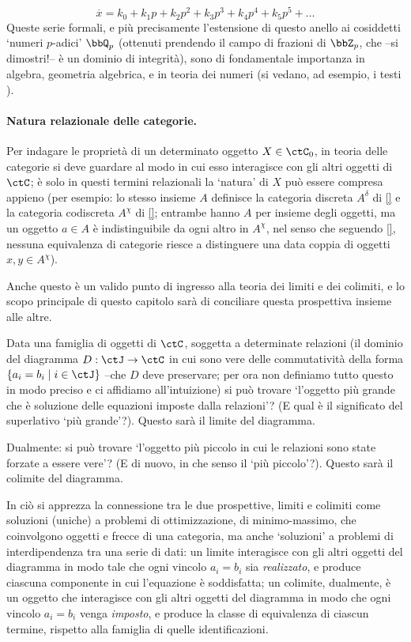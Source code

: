 \[\overline x = k_0 + k_1p + k_2p^2 + k_3p^3 + k_4p^4 + k_5p^5 + \dots \]
Queste serie formali, e più precisamente l'estensione di questo anello ai cosiddetti `numeri \(p\)-adici' \(\bbQ_p\) (ottenuti prendendo il campo di frazioni di \(\bbZ_p\), che --si dimostri!-- è un dominio di integrità), sono di fondamentale importanza in algebra, geometria algebrica, e in teoria dei numeri (si vedano, ad esempio, i testi \cite{a,b,c}).
\paragraph*{Natura relazionale delle categorie.}
Per indagare le proprietà di un determinato oggetto \(X\in\ctC_0\), in teoria delle categorie si deve guardare al modo in cui esso interagisce con gli altri oggetti di \(\ctC\); è solo in questi termini relazionali la `natura' di $X$ può essere compresa appieno (per esempio: lo stesso insieme $A$ definisce la categoria discreta $A^\delta$ di \ref{} e la categoria codiscreta $A^\chi$ di \ref{}; entrambe hanno $A$ per insieme degli oggetti, ma un oggetto $a\in A$ è indistinguibile da ogni altro in $A^\chi$, nel senso che seguendo \ref{}, nessuna equivalenza di categorie riesce a distinguere una data coppia di oggetti $x,y\in A^\chi$).

Anche questo è un valido punto di ingresso alla teoria dei limiti e dei colimiti, e lo scopo principale di questo capitolo sarà di conciliare questa prospettiva insieme alle altre.

Data una famiglia di oggetti di \(\ctC\), soggetta a determinate relazioni (il dominio del diagramma $D : \ctJ \to \ctC$ in cui sono vere delle commutatività della forma \(\{a_i=b_i\mid i\in \ctJ\}\) --che $D$ deve preservare; per ora non definiamo tutto questo in modo preciso e ci affidiamo all'intuizione) si può trovare `l'oggetto più grande che è soluzione delle equazioni imposte dalla relazioni'? (E qual è il significato del superlativo `più grande'?). Questo sarà il limite del diagramma. 

Dualmente: si può trovare `l'oggetto più piccolo in cui le relazioni sono state forzate a essere vere'? (E di nuovo, in che senso il `più piccolo'?). Questo sarà il colimite del diagramma.

In ciò si apprezza la connessione tra le due prospettive, limiti e colimiti come soluzioni (uniche) a problemi di ottimizzazione, di minimo-massimo, che coinvolgono oggetti e frecce di una categoria, ma anche `soluzioni' a problemi di interdipendenza tra una serie di dati: un limite interagisce con gli altri oggetti del diagramma in modo tale che ogni vincolo \(a_i=b_i\) sia \emph{realizzato}, e produce ciascuna componente in cui l'equazione è soddisfatta; un colimite, dualmente, è un oggetto che interagisce con gli altri oggetti del diagramma in modo che ogni vincolo \(a_i=b_i\) venga \emph{imposto}, e produce la classe di equivalenza di ciascun termine, rispetto alla famiglia di quelle identificazioni.


